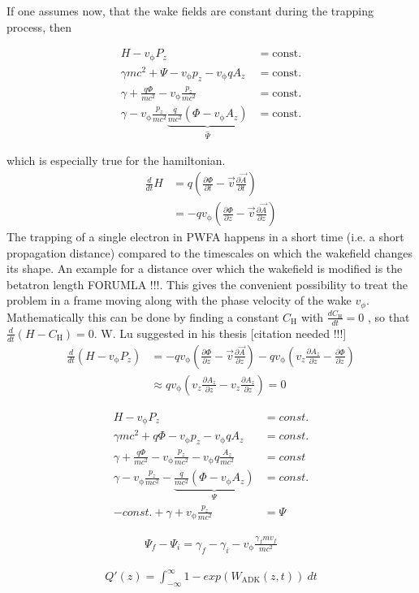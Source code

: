 \documentclass{thesis}
\begin{document}
If one assumes now, that the wake fields are constant during the trapping process, then 

\begin{align}
H-v_\mathrm{\phi}P_z &= \mathrm{const.}\\
\gamma m c^2+\Psi-v_\mathrm{\phi}p_z-v_\mathrm{\phi}qA_z &= \mathrm{const.}\\
\gamma+\frac{q \Phi}{m c^2}-v_\mathrm{\phi} \frac{p_z}{mc^2} &= \mathrm{const.}\\
\gamma - v_\mathrm{\phi} \frac{p_z}{mc^2} \underbrace{\frac{q}{mc^2}(\Phi-v_\mathrm{\phi}A_z)}_{\hat{\Psi}}  &= \mathrm{const.} 
\end{align}

which is especially true for the hamiltonian.
\begin{align*}
\frac{d}{dt}H&=q(\frac{\partial \Phi}{\partial t}-\vec{v}\frac{\partial \vec{A}}{\partial t})\\
&=-q v_\mathrm{\phi}(\frac{\partial \Phi}{\partial z}-\vec{v} \frac{\partial \vec{A}}{\partial z})
\end{align*}
The trapping of a single electron in PWFA happens in a short time (i.e. a short propagation distance) compared to the timescales on which the wakefield changes its shape. An example for a distance over which the wakefield is modified is the betatron length FORUMLA !!!.
This gives the convenient possibility to treat the problem in a frame moving along with the phase velocity of the wake $v_\phi$. Mathematically this can be done by finding a constant $C_\mathrm{H}$ with $\frac{d C_\mathrm{H}}{dt}=0$ , so that $\frac{d}{dt}(H-C_\mathrm{H})=0$.
W. Lu suggested in his thesis [citation needed !!!] 
\begin{align*}
\frac{d}{dt}(H-v_\mathrm{\phi} P_z)&=-qv_\mathrm{\phi}(\frac{\partial \Phi}{\partial z}-\vec{v}\frac{\partial \vec{A}}{\partial z})-qv_\mathrm{\phi}(v_z \frac{\partial A_z}{\partial z}-\frac{\partial \Phi}{\partial z})\\
&\approx q v_\mathrm{\phi}(v_z \frac{\partial A_z}{\partial z}-v_z \frac{\partial A_z}{\partial z})=0
\end{align*}

\begin{align*}
H-v_\mathrm{\phi}P_z&=const.\\
\gamma m c^2+q\Phi-v_\mathrm{\phi}p_z-v_\mathrm{\phi}qA_z&=const.\\
\gamma+\frac{q\Phi}{mc^2}-v_\mathrm{\phi}\frac{p_z}{mc^2}-v_\mathrm{\phi}q\frac{A_z}{mc^2}&=const\\
\gamma-v_\mathrm{\phi}\frac{p_z}{mc^2}-\underbrace{\frac{q}{mc^2}(\Phi-v_\mathrm{\phi}A_z)}_{\Psi}&=const.\\
-const. +\gamma + v_\mathrm{\phi}\frac{p_z}{mc^2}&=\Psi
\end{align*}

\begin{align*}
\Psi_f-\Psi_i=\gamma_f-\gamma_i-v_\mathrm{\phi}\frac{\gamma_f m v_f}{mc^2}
\end{align*}

\begin{align*}
Q'(z)=\int_{-\infty}^{\infty}1- exp(W_\mathrm{ADK}(z,t))\ dt
\end{align*}

\cite{Oz_PhD}


    
\end{document}
